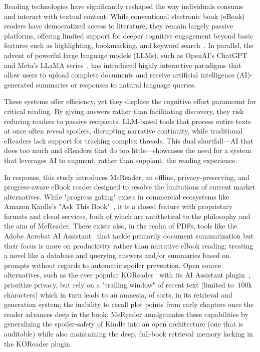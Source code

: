 Reading technologies have significantly reshaped the way individuals consume and interact with textual content. While conventional electronic book (eBook) readers have democratized access to literature, they remain largely passive platforms, offering limited support for deeper cognitive engagement beyond basic features such as highlighting, bookmarking, and keyword search~\cite{b1}. In parallel, the advent of powerful large language models (LLMs), such as OpenAI’s ChatGPT~\cite{b2} and Meta’s LLaMA series~\cite{b3}, has introduced highly interactive paradigms that allow users to upload complete documents and receive artificial intelligence (AI)-generated summaries or responses to natural language queries.

These systems offer efficiency, yet they displace the cognitive effort paramount for critical reading. By giving answers rather than facilitating discovery, they risk reducing readers to passive recipients. LLM-based tools that process entire texts at once often reveal spoilers, disrupting narrative continuity, while traditional eReaders lack support for tracking complex threads. This dual shortfall—AI that does too much and eReaders that do too little—showcases the need for a system that leverages AI to augment, rather than supplant, the reading experience.

In response, this study introduces MeReader, an offline, privacy-preserving, and progress-aware eBook reader designed to resolve the limitations of current market alternatives.
While "progress gating" exists in commercial ecosystems like Amazon Kindle's "Ask This Book"~\cite{engadget_kindle,verge_kindle}, it is a closed feature with proprietary formats and cloud services, both of which are antithetical to the philosophy and the aim of MeReader.
There exists also, in the realm of PDFs, tools like the Adobe Acrobat AI Assistant~\cite{verge_pdfs} that tackle primarily document summarization but their focus is more on productivity rather than narrative eBook reading; treating a novel like a database and querying answers and/or summaries based on prompts without regards to automatic spoiler prevention.
Open source alternatives, such as the ever popular KOReader~\cite{github_koreader} with its AI Assistant plugin~\cite{github_koreader_plugin}, prioritize privacy, but rely on a "trailing window" of recent text (limited to $~100$k characters) which in turn leads to an amnesia, of sorts, in its retrieval and generation system; the inability to recall plot points from early chapters once the reader advances deep in the book.
MeReader amalgamates these capabilities by generalizing the spoiler-safety of Kindle into an open architecture (one that is auditable) while also maintaining the deep, full-book retrieval memory lacking in the KOReader plugin.

